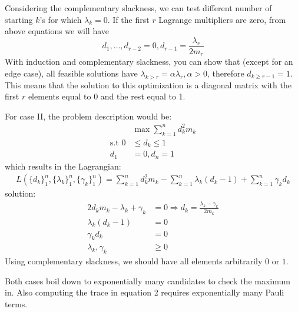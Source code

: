 \documentclass[11pt]{article}
\begin{document}
Considering the complementary slackness, we can test different number of starting $k$'s for which $\lambda_k = 0$. If the first $r$ Lagrange multipliers are zero, from above equations we will have 
$$
d_1, \dots, d_{r-2} = 0, d_{r-1} = \frac{\lambda_r}{2m_r}
$$
With induction and complementary slackness, you can show that (except for an edge case), all feasible solutions have $\lambda_{k>r} = \alpha \lambda_r, \alpha > 0$, therefore $d_{k \ge r-1} = 1$. This means that the solution to this optimization is a diagonal matrix with the first $r$ elements equal to 0 and the rest equal to 1.


For case II, the problem description would be:
\begin{align}
    &\max \sum_{k=1}^n{d_k^2m_k} \\
    \text{s.t } 0 &\le d_k \le 1\\
    d_1 &= 0, d_n = 1
\end{align}
which results in the Lagrangian:
\begin{align}
    L(\{d_k\}^n_1, \{\lambda_k\}^n_1, \{\gamma_k\}^n_1) = \sum_{k=1}^n{d_k^2m_k} - \sum_{k=1}^n{\lambda_k(d_k - 1) + \sum_{k=1}^n{\gamma_kd_k}}
\end{align}
solution:
\begin{align}
    2d_km_k - \lambda_k + \gamma_k &= 0 \Rightarrow d_k = \frac{\lambda_k - \gamma_k}{2m_k}\\
    \lambda_k(d_k - 1) &= 0 \\
    \gamma_kd_k &= 0 \\
    \lambda_k, \gamma_k &\ge 0
\end{align}
Using complementary slackness, we should have all elements arbitrarily $0$ or $1$.

Both cases boil down to exponentially many candidates to check the maximum in. Also computing the trace in equation 2 requires exponentially many Pauli terms.
\end{document}
